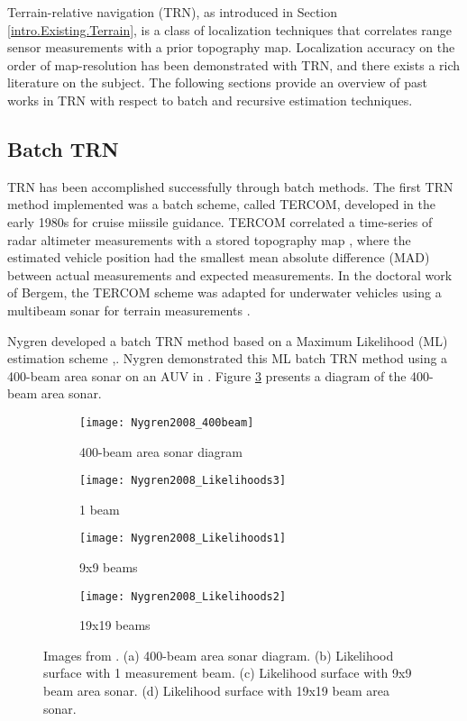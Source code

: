 Terrain-relative navigation (TRN), as introduced in Section \ref{intro.Existing.Terrain}, is a class of localization techniques that correlates range sensor measurements with a prior topography map.
Localization accuracy on the order of map-resolution has been demonstrated with TRN, and there exists a rich literature on the subject.
The following sections provide an overview of past works in TRN with respect to batch and recursive estimation techniques.

\subsection{Batch TRN}
\label{related.TRN.Batch}

TRN has been accomplished successfully through batch methods.
The first TRN method implemented was a batch scheme, called TERCOM, developed in the early 1980s for cruise miissile guidance.
TERCOM correlated a time-series of radar altimeter measurements with a stored topography map \cite{Golden1980}, where the estimated vehicle position had the smallest mean absolute difference (MAD) between actual measurements and expected measurements.
In the doctoral work of Bergem, the TERCOM scheme was adapted for underwater vehicles using a multibeam sonar for terrain measurements \cite{Bergem1993}.

Nygren developed a batch TRN method based on a Maximum Likelihood (ML) estimation scheme \cite{Nygren2004},\cite{Nygren2005}.
Nygren demonstrated this ML batch TRN method using a 400-beam area sonar on an AUV in \cite{Nygren2008}.
Figure \ref{fig:nygren} presents a diagram of the 400-beam area sonar.  

\begin{figure}[!h!]  	
	\centering
	\begin{subfigure}[b]{0.5\textwidth}
		\texttt{[image: Nygren2008\_400beam]}
		\caption{400-beam area sonar diagram}
 	 \end{subfigure}
  	\centering
  	
	\centering
	\begin{subfigure}[b]{0.32\textwidth}
                \texttt{[image: Nygren2008\_Likelihoods3]}
                \caption{1 beam}
                \label{fig:nygren1}
  	\end{subfigure}
  	\centering
	\begin{subfigure}[b]{0.32\textwidth}
                \texttt{[image: Nygren2008\_Likelihoods1]}
                \caption{9x9 beams}
  	\end{subfigure}
  	\centering
	\begin{subfigure}[b]{0.32\textwidth}
                \texttt{[image: Nygren2008\_Likelihoods2]}
                \caption{19x19 beams}
                \label{fig:nygren19}
  	\end{subfigure}
  		
  	\caption{Images from \cite{Nygren2008}. (a) 400-beam area sonar diagram. (b) Likelihood surface with 1 measurement beam. (c) Likelihood surface with 9x9 beam area sonar. (d) Likelihood surface with 19x19 beam area sonar.}
  	\label{fig:nygren}
\end{figure}

